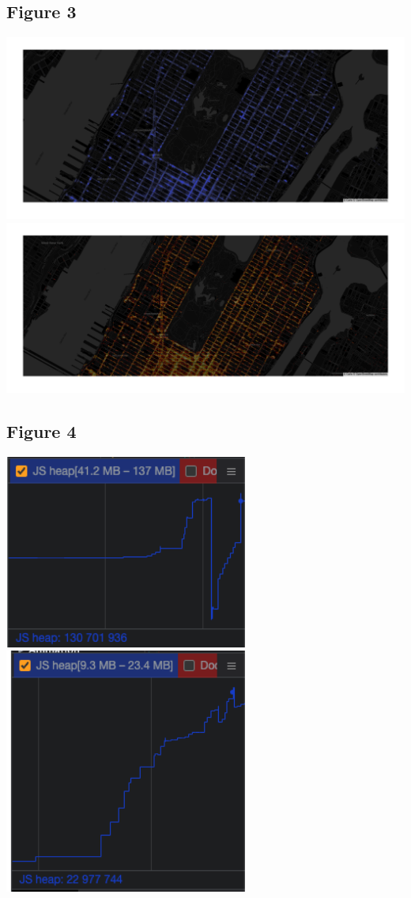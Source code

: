 \documentclass{article}
\begin{document}
\subsection{Figure 3}
\includegraphics[width=1\textwidth]{img/newyork_plotly.png}
\includegraphics[width=1\textwidth]{img/newyork_datashader.png}

\subsection{Figure 4}
\includegraphics[width=0.6\textwidth]{img/js_heap_plotly.png}
\includegraphics[width=0.6\textwidth]{img/js_heap_datashader.png}
\end{document}
